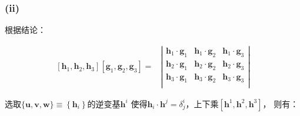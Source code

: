 \documentclass[UTF8,zihao=5]{ctexart}
\newcommand{\bm}[1]{{\mathbf{#1}}}
\begin{document}
\subsubsection*{(ii)}

根据结论：

\begin{equation}
    \begin{aligned}
        [\bm{h}_1,\bm{h}_2,\bm{h}_3][\bm{g}_1,\bm{g}_2,\bm{g}_3]
        = & \left|
        \begin{matrix}
            \bm{h}_1\cdot\bm{g}_1 & \bm{h}_1\cdot\bm{g}_2 & \bm{h}_1\cdot\bm{g}_3 \\
            \bm{h}_2\cdot\bm{g}_1 & \bm{h}_2\cdot\bm{g}_2 & \bm{h}_2\cdot\bm{g}_3 \\
            \bm{h}_3\cdot\bm{g}_1 & \bm{h}_3\cdot\bm{g}_2 & \bm{h}_3\cdot\bm{g}_3 \\
        \end{matrix}
        \right|
    \end{aligned}
\end{equation}

选取$\{\bm{u},\bm{v},\bm{w}\}\equiv\left\{\bm{h}_i\right\}$的逆变基$\bm{h}^i$
使得$\bm{h}_i\cdot\bm{h}^j=\delta^i_j$，上下乘$[\bm{h}^1,\bm{h}^2,\bm{h}^3]$，
则有：
\end{document}

